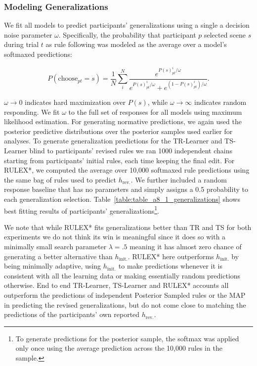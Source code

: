 \documentclass[doc,natbib,floatsintext]{apa7}
\newcommand{\hr}{h_{\mathrm{rev.}}}
\newcommand{\hi}{h_{\mathrm{init.}}}
\begin{document}
\begin{appendices}
\subsubsection{Modeling Generalizations}

We fit all models to predict participants' generalizations using a single a decision noise parameter \(\omega\). Specifically, the probability that participant $p$ selected scene $s$ during trial $t$ as rule following was modeled as the average over a model's softmaxed predictions: 

\begin{equation}
    P(\mathrm{choose}_{pt}=s) = \frac{1}{N}\sum_i^N \frac{e^{P(s)^i_{pt}/\omega}}{e^{P(s)^i_{pt}/\omega} + e^{(1-P(s)^i_{pt})/\omega}}.
\label{equ:equ_a8_1_softmax}
\end{equation}

$\omega\rightarrow 0$ indicates hard maximization over $P(s)$, while $\omega\rightarrow\infty$ indicates random responding. We fit $\omega$ to the full set of responses for all models using maximum likelihood estimation. For generating normative predictions, we again used the posterior predictive distributions over the posterior samples used earlier for analyses. To generate generalization predictions for the TR-Learner and TS-Learner blind to participants' revised rules we ran 1000 independent chains starting from participants' initial rules, each time keeping the final edit. For RULEX*, we computed the average over 10,000 softmaxed rule predictions using the same bag of rules used to predict $\hr$. We further included a random response baseline that has no parameters and simply assigns a 0.5 probability to each generalization selection. Table~\ref{table:table_a8_1_generalizations} shows best fitting results of participants' generalizations\footnote{To generate predictions for the posterior sample, the softmax was applied only once using the average prediction across the 10,000 rules in the sample.}. 

We note that while RULEX* fits generalizations better than TR and TS for both experiments we do not think its win is meaningful since it does so with a minimally small search parameter $\lambda = .5$ meaning it has almost zero chance of generating a better alternative than $\hi$. RULEX* here outperforms $\hi$ by being minimally adaptive, using $\hi$ to make predictions whenever it is consistent with all the learning data or making essentially random predictions otherwise. End to end TR-Learner, TS-Learner and RULEX* accounts all outperform the predictions of independent Posterior Sampled rules or the MAP in predicting the revised generalizations, but do not come close to matching the predictions of the participants' own reported $\hr$.


\end{appendices}
\end{document}
